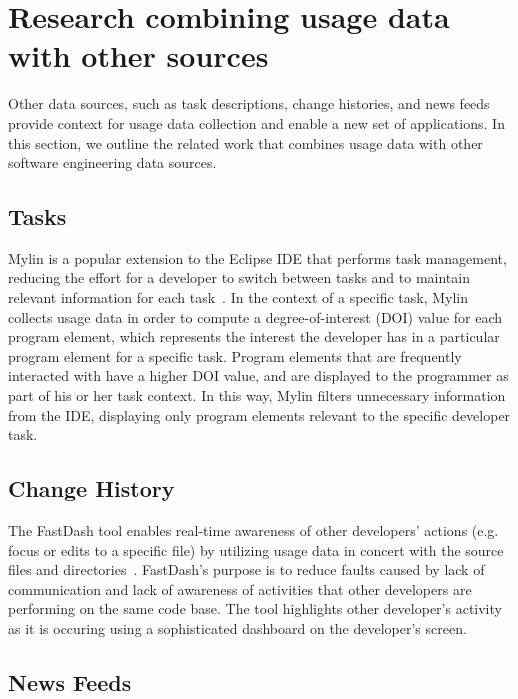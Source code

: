 \section{Research combining usage data with other sources}

Other data sources, such as task descriptions, change histories, and
news feeds provide context for usage data collection and enable a new
set of applications. In this section, we outline the related work that
combines usage data with other software engineering data sources.


\subsection{Tasks}

Mylin is a popular extension to the Eclipse IDE that performs task
management, reducing the effort for a developer to switch between
tasks and to maintain relevant information for each
task~\cite{Kersten-Mylin}. In the context of a specific task, Mylin
collects usage data in order to compute a degree-of-interest (DOI)
value for each program element, which represents the interest the
developer has in a particular program element for a specific
task. Program elements that are frequently interacted with have a
higher DOI value, and are displayed to the programmer as part of his
or her task context.  In this way, Mylin filters unnecessary
information from the IDE, displaying only program elements relevant to
the specific developer task.


\subsection{Change History}


The FastDash tool enables real-time awareness of other developers'
actions (e.g. focus or edits to a specific file) by utilizing usage
data in concert with the source files and
directories~\cite{FastDash}. FastDash's purpose is to reduce faults
caused by lack of communication and lack of awareness of activities
that other developers are performing on the same code base. The tool
highlights other developer's activity as it is occuring using a
sophisticated dashboard on the developer's screen.



\subsection{News Feeds}

